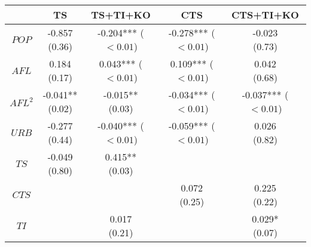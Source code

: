 \begin{tabular}{ccccc}
\toprule
                                               &                                 TS &                           TS+TI+KO &                                CTS &                          CTS+TI+KO \\
\midrule
                                         $POP$ &          \makecell{-0.857\\(0.36)} &   \makecell{-0.204***\\($< 0.01$)} &   \makecell{-0.278***\\($< 0.01$)} &          \makecell{-0.023\\(0.73)} \\
                                         $AFL$ &           \makecell{0.184\\(0.17)} &    \makecell{0.043***\\($< 0.01$)} &    \makecell{0.109***\\($< 0.01$)} &           \makecell{0.042\\(0.68)} \\
                                       $AFL^2$ &        \makecell{-0.041**\\(0.02)} &        \makecell{-0.015**\\(0.03)} &   \makecell{-0.034***\\($< 0.01$)} &   \makecell{-0.037***\\($< 0.01$)} \\
                                         $URB$ &          \makecell{-0.277\\(0.44)} &   \makecell{-0.040***\\($< 0.01$)} &   \makecell{-0.059***\\($< 0.01$)} &           \makecell{0.026\\(0.82)} \\
                                          $TS$ &          \makecell{-0.049\\(0.80)} &         \makecell{0.415**\\(0.03)} &                                    &                                    \\
                                         $CTS$ &                                    &                                    &           \makecell{0.072\\(0.25)} &           \makecell{0.225\\(0.22)} \\
                                          $TI$ &                                    &           \makecell{0.017\\(0.21)} &                                    &          \makecell{0.029*\\(0.07)} \\

\end{tabular}
